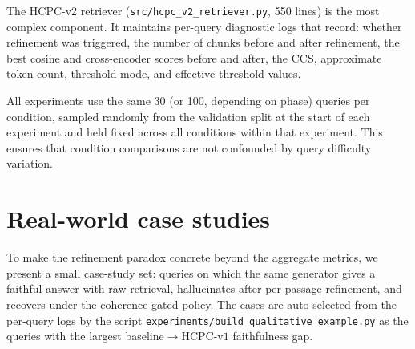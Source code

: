 The HCPC-v2 retriever (\texttt{src/hcpc\_v2\_retriever.py}, 550 lines)
is the most complex component. It maintains per-query diagnostic logs
that record: whether refinement was triggered, the number of chunks
before and after refinement, the best cosine and cross-encoder scores
before and after, the CCS, approximate token count, threshold mode,
and effective threshold values.

All experiments use the same 30 (or 100, depending on phase) queries per
condition, sampled randomly from the validation split at the start of
each experiment and held fixed across all conditions within that
experiment. This ensures that condition comparisons are not confounded
by query difficulty variation.

\section{Real-world case studies}
\label{app:case_studies}

To make the refinement paradox concrete beyond the aggregate metrics,
we present a small case-study set: queries on which the same generator
gives a faithful answer with raw retrieval, hallucinates after
per-passage refinement, and recovers under the coherence-gated policy.
The cases are auto-selected from the per-query logs by the script
\texttt{experiments/build\_qualitative\_example.py} as the queries
with the largest baseline$\to$HCPC-v$1$ faithfulness gap.


